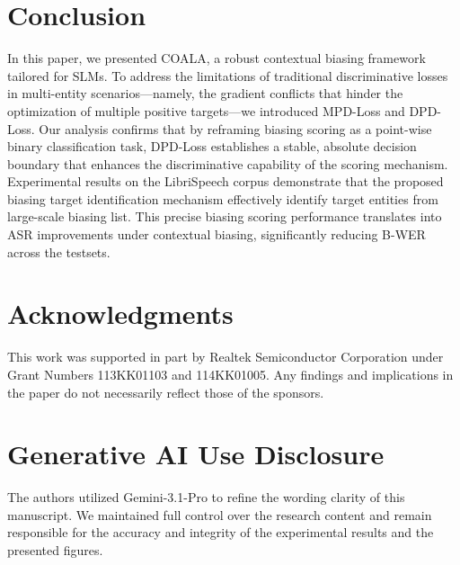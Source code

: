 \documentclass[cameraready]{Interspeech}
\begin{document}
\section{Conclusion}

In this paper, we presented COALA, a robust contextual biasing framework tailored for SLMs.
%
To address the limitations of traditional discriminative losses in multi-entity scenarios—namely, the gradient conflicts that hinder the optimization of multiple positive targets—we introduced MPD-Loss and DPD-Loss.
%
Our analysis confirms that by reframing biasing scoring as a point-wise binary classification task, DPD-Loss establishes a stable, absolute decision boundary that enhances the discriminative capability of the scoring mechanism.
%
Experimental results on the LibriSpeech corpus demonstrate that the proposed biasing target identification mechanism effectively identify target entities from large-scale biasing list.
%
This precise biasing scoring performance translates into ASR improvements under contextual biasing, significantly reducing B-WER across the testsets.



\section{Acknowledgments}
This work was supported in part by Realtek Semiconductor Corporation under Grant Numbers 113KK01103 and 114KK01005. Any findings and implications in the paper do not necessarily reflect those of the sponsors.

\section{Generative AI Use Disclosure}
The authors utilized Gemini-3.1-Pro to refine the wording clarity of this manuscript. We maintained full control over the research content and remain responsible for the accuracy and integrity of the experimental results and the presented figures.



\end{document}
